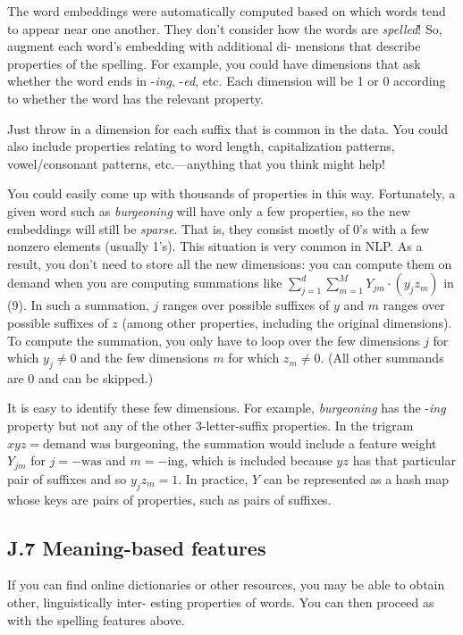 The word embeddings were automatically computed based on which words tend to appear near one another. 
They don’t consider how the words are \emph{spelled}! So, augment each word’s embedding with additional di-
mensions that describe properties of the spelling. For example, you could have dimensions that ask whether 
the word ends in -\emph{ing}, -\emph{ed}, etc. Each dimension will be 1 or 0 according to whether the word has the 
relevant property. 

Just throw in a dimension for each suffix that is common in the data. You could also include properties 
relating to word length, capitalization patterns, vowel/consonant patterns, etc.—anything that you think 
might help! 

You could easily come up with thousands of properties in this way. Fortunately, a given word such as 
\emph{burgeoning} will have only a few properties, so the new embeddings will still be \emph{sparse}. That is, they consist 
mostly of 0’s with a few nonzero elements (usually 1’s). This situation is very common in NLP. As a result, 
you don’t need to store all the new dimensions: you can compute them on demand when you are computing 
summations like $\sum_{j=1}^d \sum_{m=1}^M Y_{jm}\cdot(y_j z_m)$ in (9). In such a summation, $j$ ranges over possible suffixes of 
$y$ and $m$ ranges over possible suffixes of $z$ (among other properties, including the original dimensions). To 
compute the summation, you only have to loop over the few dimensions $j$ for which $y_j \neq 0$ and the few 
dimensions $m$ for which $z_m \neq 0$. (All other summands are 0 and can be skipped.) 

It is easy to identify these few dimensions. For example, \emph{burgeoning} has the -\emph{ing} property but 
not any of the other 3-letter-suffix properties. In the trigram $xyz = \text{demand was burgeoning}$, the 
summation would include a feature weight $Y_{jm}$ for $j = -\text{was}$ and $m = -\text{ing}$, which is included because 
$yz$ has that particular pair of suffixes and so $y_j z_m = 1$. In practice, $Y$ can be represented as a hash map 
whose keys are pairs of properties, such as pairs of suffixes.

\subsection*{J.7 Meaning-based features}

If you can find online dictionaries or other resources, you may be able to obtain other, linguistically inter-
esting properties of words. You can then proceed as with the spelling features above.

